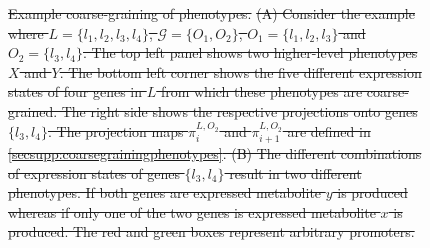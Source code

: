 \documentclass[10pt]{article}
\def\refsupp{Supplementary Material}
\providecommand{\DIFdeltex}[1]{{\protect\color{red}\sout{#1}}}                      %
\providecommand{\DIFdelFL}[1]{\DIFdel{#1}} %
\providecommand{\DIFdelbeginFL}{} %
\providecommand{\DIFdel}[1]{\texorpdfstring{\DIFdeltex{#1}}{}} %
\begin{document}
\begin{figure}[!ht]
\centering
\noindent\DIFdelbeginFL %
\DIFdelFL{Example coarse-graining of phenotypes.}%
\DIFdelFL{(A) Consider the example where $L = \{l_1,l_2,l_3,l_4\}$, $\mathcal{G} = \{ O_1, O_2 \}$, $O_1 = \{l_1, l_2, l_3\}$ and $O_2 = \{ l_3, l_4 \}$. The top left panel shows two higher-level phenotypes $X$ and $Y$. The bottom left corner shows the five different expression states of four genes in $L$ from which these phenotypes are coarse-grained. The right side shows the respective projections onto genes $\{l_3,l_4\}$. The projection maps $\pi_i^{L,O_2}$ and $\pi_{i+1}^{L,O_2}$ are defined in }%
\DIFdelFL{\ref{secsupp:coarsegrainingphenotypes}. (B) The different combinations of expression states of genes $\{l_3,l_4\}$ result in two different phenotypes. If both genes are expressed metabolite $y$ is produced whereas if only one of the two genes is expressed metabolite $x$ is produced. The red and green boxes represent arbitrary promoters.}%


\end{figure}
\end{document}
